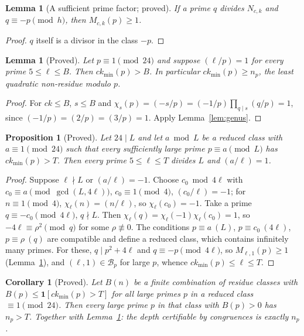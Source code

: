 \documentclass[11pt,reqno]{amsart}
\newtheorem{lemma}[theorem]{Lemma}
\newtheorem{proposition}[theorem]{Proposition}
\newtheorem{corollary}[theorem]{Corollary}
\theoremstyle{definition}
\newcommand{\cB}{\mathcal B}
\newcommand{\ckmin}{ck_{\min}}
\begin{document}
\begin{lemma}[A sufficient prime factor; proved]\label{lem:goodprime}
If a prime $q$ divides $N_{c,k}$ and $q\equiv-p\pmod h$, then $M_{c,k}(p)\ge1$.
\end{lemma}

\begin{proof}
$q$ itself is a divisor in the class $-p$.
\end{proof}

\begin{lemma}[Proved]\label{lem:np}
Let $p\equiv1\pmod{24}$ and suppose $(\ell/p)=1$ for every prime $5\le\ell\le B$.
Then $\ckmin(p)>B$.  In particular $\ckmin(p)\ge n_p$, the least quadratic
non-residue modulo $p$.
\end{lemma}

\begin{proof}
For $ck\le B$, $s\le B$ and
$\chi_s(p)=(-s/p)=(-1/p)\prod_{q\mid s}(q/p)=1$, since
$(-1/p)=(2/p)=(3/p)=1$.  Apply Lemma~\ref{lem:genus}.
\end{proof}

\begin{proposition}[Proved]\label{prop:QR}
Let $24\mid L$ and let $a\bmod L$ be a reduced class with $a\equiv1\pmod{24}$
such that every sufficiently large prime $p\equiv a\pmod L$ has $\ckmin(p)>T$.
Then every prime $5\le\ell\le T$ divides $L$ and $(a/\ell)=1$.
\end{proposition}

\begin{proof}
Suppose $\ell\nmid L$ or $(a/\ell)=-1$.  Choose $c_0\bmod4\ell$ with
$c_0\equiv a\pmod{\gcd(L,4\ell)}$, $c_0\equiv1\pmod4$, $(c_0/\ell)=-1$; for
$n\equiv1\pmod 4$, $\chi_\ell(n)=(n/\ell)$, so $\chi_\ell(c_0)=-1$.  Take a prime
$q\equiv-c_0\pmod{4\ell}$, $q\nmid L$.  Then $\chi_\ell(q)=\chi_\ell(-1)\chi_\ell(c_0)=1$,
so $-4\ell\equiv\rho^2\pmod q$ for some $\rho\not\equiv0$.  The conditions
$p\equiv a\ (L)$, $p\equiv c_0\ (4\ell)$, $p\equiv\rho\ (q)$ are compatible and
define a reduced class, which contains infinitely many primes.  For these,
$q\mid p^2+4\ell$ and $q\equiv-p\pmod{4\ell}$, so $M_{\ell,1}(p)\ge1$
(Lemma~\ref{lem:goodprime}), and $(\ell,1)\in\cB_p$ for large $p$, whence
$\ckmin(p)\le\ell\le T$.
\end{proof}

\begin{corollary}[Proved]\label{cor:exactly}
Let $B(n)$ be a finite combination of residue classes with
$B(p)\le\mathbf 1[\ckmin(p)>T]$ for all large primes $p$ in a reduced class
$\equiv1\pmod{24}$.  Then every large prime $p$ in that class with $B(p)>0$ has
$n_p>T$.  Together with Lemma~\ref{lem:np}: the depth certifiable by
congruences is exactly $n_p$.
\end{corollary}
\end{document}
